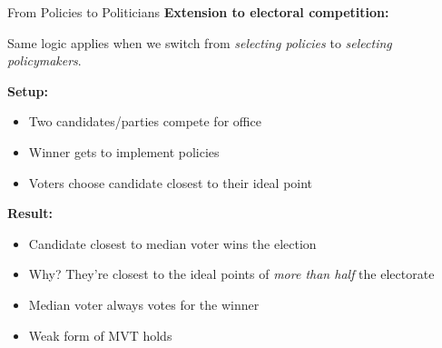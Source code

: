 \documentclass[10pt]{beamer}
\begin{document}
\begin{frame}{From Policies to Politicians}
\textbf{Extension to electoral competition:}


Same logic applies when we switch from \textit{selecting policies} to \textit{selecting policymakers}.



\textbf{Setup:}
\begin{itemize}
\item Two candidates/parties compete for office
\item Winner gets to implement policies
\item Voters choose candidate closest to their ideal point
\end{itemize}



\textbf{Result:}
\begin{itemize}
\item Candidate closest to median voter \alert{wins the election}
\item Why? They're closest to the ideal points of \textit{more than half} the electorate
\item Median voter always votes for the winner
\item Weak form of MVT holds
\end{itemize}
\end{frame}
\end{document}
